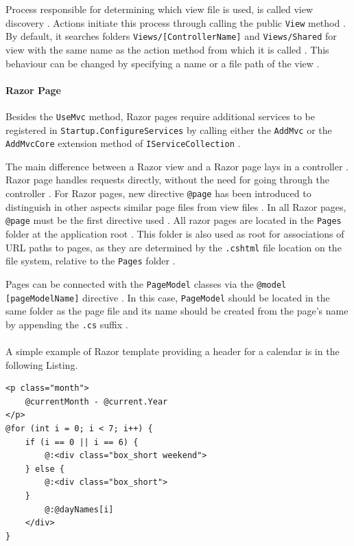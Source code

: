 Process responsible for determining which view file is used, is called view discovery \citep{microsoft.docs}. Actions initiate this process through calling the public \texttt{View} method \citep{microsoft.docs}. By default, it searches folders \texttt{Views/[ControllerName]} and \texttt{Views/Shared} for view with the same name as the action method from which it is called \citep{microsoft.docs}. This behaviour can be changed by specifying a name or a file path of the view \citep{microsoft.docs}. 

\paragraph{Razor Page}
Besides the \texttt{UseMvc} method, Razor pages require additional services to be registered in \texttt{Startup.ConfigureServices} by calling either the \texttt{AddMvc} or the \texttt{AddMvcCore} extension method of \texttt{IServiceCollection} \citep{microsoft.docs}.

The main difference between a Razor view and a Razor page lays in a controller \citep{microsoft.docs}. Razor page handles requests directly, without the need for going through the controller \citep{microsoft.docs}. For Razor pages, new directive \texttt{@page} has been introduced to distinguish in other aspects similar page files from view files \citep{microsoft.docs}. In all Razor pages, \texttt{@page} must be the first directive used \citep{microsoft.docs}. All razor pages are located in the \texttt{Pages} folder at the application root \citep{microsoft.docs}. This folder is also used as root for associations of URL paths to pages, as they are determined by the \texttt{.cshtml} file location on the file system, relative to the \texttt{Pages} folder \citep{microsoft.docs}.

Pages can be connected with the \texttt{PageModel} classes via the \texttt{@model [pageModelName]} directive \citep{microsoft.docs}. In this case, \texttt{PageModel} should be located in the same folder as the page file and its name should be created from the page's name by appending the \texttt{.cs} suffix \citep{microsoft.docs}.

\paragraph{} A simple example of Razor template providing a header for a calendar is in the following Listing.

\begin{center}
\begin{lstlisting}[caption={Razor example},captionpos=b]
<p class="month">
	@currentMonth - @current.Year
</p>
@for (int i = 0; i < 7; i++) {
	if (i == 0 || i == 6) {
		@:<div class="box_short weekend">
	} else {
		@:<div class="box_short">
	}
		@:@dayNames[i]
	</div>
}
\end{lstlisting}
\end{center}
